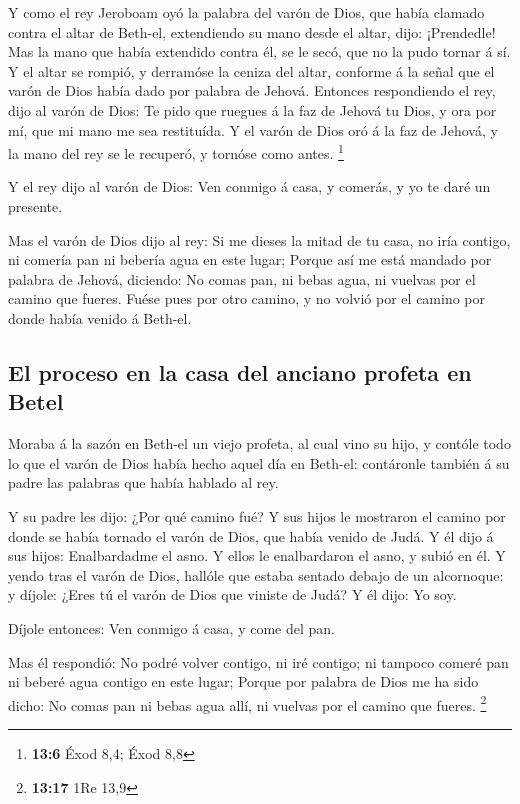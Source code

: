 Y como el rey Jeroboam oyó la palabra del varón de Dios,
que había clamado contra el altar de Beth-el, extendiendo su mano desde
el altar, dijo: ¡Prendedle! Mas la mano que había extendido contra él,
se le secó, que no la pudo tornar á sí.  Y el altar se
rompió, y derramóse la ceniza del altar, conforme á la señal que el
varón de Dios había dado por palabra de Jehová.  Entonces
respondiendo el rey, dijo al varón de Dios: Te pido que ruegues á la faz
de Jehová tu Dios, y ora por mí, que mi mano me sea restituída. Y el
varón de Dios oró á la faz de Jehová, y la mano del rey se le recuperó,
y tornóse como antes. \footnote{\textbf{13:6} Éxod 8,4; Éxod 8,8}

 Y el rey dijo al varón de Dios: Ven conmigo á casa, y
comerás, y yo te daré un presente.

 Mas el varón de Dios dijo al rey: Si me dieses la mitad
de tu casa, no iría contigo, ni comería pan ni bebería agua en este
lugar;  Porque así me está mandado por palabra de Jehová,
diciendo: No comas pan, ni bebas agua, ni vuelvas por el camino que
fueres.  Fuése pues por otro camino, y no volvió por el
camino por donde había venido á Beth-el.

\hypertarget{el-proceso-en-la-casa-del-anciano-profeta-en-betel}{%
\subsection{El proceso en la casa del anciano profeta en
Betel}\label{el-proceso-en-la-casa-del-anciano-profeta-en-betel}}

 Moraba á la sazón en Beth-el un viejo profeta, al cual
vino su hijo, y contóle todo lo que el varón de Dios había hecho aquel
día en Beth-el: contáronle también á su padre las palabras que había
hablado al rey.

 Y su padre les dijo: ¿Por qué camino fué? Y sus hijos le
mostraron el camino por donde se había tornado el varón de Dios, que
había venido de Judá.  Y él dijo á sus hijos:
Enalbardadme el asno. Y ellos le enalbardaron el asno, y subió en él.
 Y yendo tras el varón de Dios, hallóle que estaba
sentado debajo de un alcornoque: y díjole: ¿Eres tú el varón de Dios que
viniste de Judá? Y él dijo: Yo soy.

 Díjole entonces: Ven conmigo á casa, y come del pan.

 Mas él respondió: No podré volver contigo, ni iré
contigo; ni tampoco comeré pan ni beberé agua contigo en este lugar;
 Porque por palabra de Dios me ha sido dicho: No comas
pan ni bebas agua allí, ni vuelvas por el camino que fueres. \footnote{\textbf{13:17}
  1Re 13,9}

